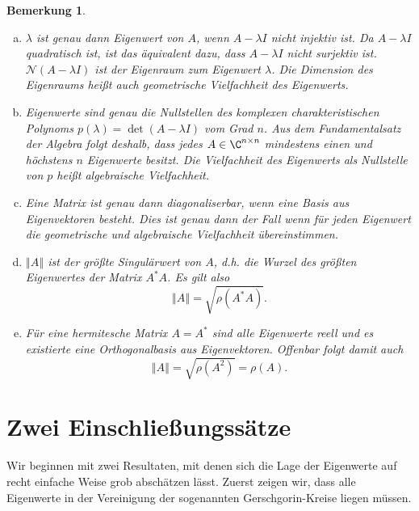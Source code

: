 \documentclass[
]{mycourse}
\theoremstyle{mythm}
\newtheorem{bemerkung}[theorem]{Bemerkung}
\theoremstyle{break}
\newcommand{\Kern}{\mathcal{N}}
\newcommand{\norm}[1]{\left\Vert#1\right\Vert}		%
\begin{document}
\begin{bemerkung}\label{bem:EWe}
\begin{enumerate}[(a)]
\item $\lambda$ ist genau dann Eigenwert von $A$, wenn $A-\lambda I$ nicht injektiv ist. Da $A-\lambda I$ quadratisch ist, ist das äquivalent dazu, dass $A-\lambda I$ nicht surjektiv ist. $\Kern(A-\lambda I)$ ist der \emph{Eigenraum} zum Eigenwert $\lambda$. Die Dimension des Eigenraums
heißt auch \emph{geometrische Vielfachheit} des Eigenwerts. 
%
\item Eigenwerte sind genau die Nullstellen des komplexen \emph{charakteristischen Polynoms} $p(\lambda)=\det(A-\lambda I)$ vom Grad $n$.
 Aus dem Fundamentalsatz der Algebra folgt deshalb, dass jedes $A\in \C^{n\times n}$ mindestens einen und höchstens $n$ Eigenwerte
 besitzt. Die Vielfachheit des Eigenwerts als Nullstelle von $p$ heißt \emph{algebraische Vielfachheit}.
 \item Eine Matrix ist genau dann \emph{diagonaliserbar}, wenn eine Basis aus Eigenvektoren besteht. Dies ist genau dann der Fall wenn für jeden Eigenwert die geometrische und algebraische Vielfachheit übereinstimmen.
 \item $\norm{A}$ ist der größte Singulärwert von $A$, d.h. die Wurzel des größten Eigenwertes der Matrix $A^*A$. Es gilt also
 \[
 \norm{A}=\sqrt{\rho(A^*A)}.
 \] 
\item Für eine \emph{hermitesche} Matrix $A=A^*$ sind alle Eigenwerte reell und es existierte eine Orthogonalbasis aus Eigenvektoren. Offenbar folgt damit auch
\[
\norm{A}=\sqrt{\rho(A^2)}=\rho(A).
\]
\end{enumerate}
\end{bemerkung}



\section{Zwei Einschließungssätze}

Wir beginnen mit zwei Resultaten, mit denen sich die Lage der Eigenwerte auf recht einfache Weise grob abschätzen lässt.
Zuerst zeigen wir, dass alle Eigenwerte in der Vereinigung der sogenannten Gerschgorin-Kreise liegen müssen.
\end{document}
